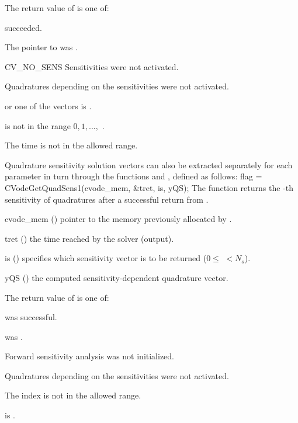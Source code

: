 {
  The return value  of  is one of:
  \begin{args}[CV\_NO\_QUADSENS]
  \item[\Id{CV\_SUCCESS}]
     succeeded.
  \item[\Id{CVODE\_MEM\_NULL}]
    The pointer to  was .
  \item[CV\_NO\_SENS]
    Sensitivities were not activated.
  \item[\Id{CV\_NO\_QUADSENS}] 
    Quadratures depending on the sensitivities were not activated.
  \item[\Id{CV\_BAD\_DKY}] 
     or one of the vectors  is .
  \item[\Id{CV\_BAD\_K}]
     is not in the range $0, 1, ...,$ .
  \item[\Id{CV\_BAD\_T}] 
    The time  is not in the allowed range.
  \end{args}
}
{}
Quadrature sensitivity solution vectors can also be extracted separately for 
each parameter in turn through the functions  and
, defined as follows:
{
  flag = CVodeGetQuadSens1(cvode\_mem, \&tret, is, yQS);
}
{
  The function  returns the -th sensitivity 
  of quadratures after a successful return from .
}
{
  \begin{args}
  \item[cvode\_mem] ()
    pointer to the memory previously allocated by .
  \item[tret] ()
    the time reached by the solver (output).
  \item[is] () specifies which sensitivity vector is to be returned
    ($0 \le $  $< N_s$).
  \item[yQS] ()
    the computed sensitivity-dependent quadrature vector.
  \end{args}
}
{
  The return value  of  is one of:
  \begin{args}[CV\_NO\_QUADSENS]
  \item[\Id{CV\_SUCCESS}]
     was successful.
  \item[\Id{CVODE\_MEM\_NULL}] 
     was .
  \item[\Id{CV\_NO\_SENS}] 
    Forward sensitivity analysis was not initialized.
  \item[\Id{CV\_NO\_QUADSENS}] 
    Quadratures depending on the sensitivities were not activated.
  \item[\Id{CV\_BAD\_IS}]
    The index  is not in the allowed range.
  \item[\Id{CV\_BAD\_DKY}] 
     is .
  \end{args}
}

